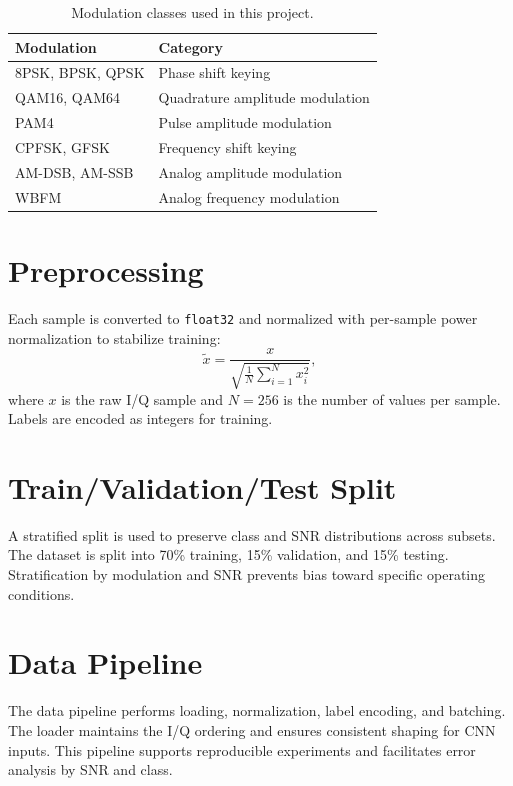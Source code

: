 \documentclass[12pt,a4paper]{report}
\begin{document}
\begin{table}[H]
    \centering
    \caption{Modulation classes used in this project.}
    \label{tab:classes}
    \begin{tabular}{p{} p{}}
        \toprule
        \textbf{Modulation} & \textbf{Category} \\
        \midrule
        8PSK, BPSK, QPSK & Phase shift keying \\
        QAM16, QAM64 & Quadrature amplitude modulation \\
        PAM4 & Pulse amplitude modulation \\
        CPFSK, GFSK & Frequency shift keying \\
        AM-DSB, AM-SSB & Analog amplitude modulation \\
        WBFM & Analog frequency modulation \\
        \bottomrule
    \end{tabular}
\end{table}

\section{Preprocessing}
Each sample is converted to \texttt{float32} and normalized with per-sample power normalization to stabilize training:
\begin{equation}
    \tilde{x} = \frac{x}{\sqrt{\frac{1}{N}\sum_{i=1}^{N} x_i^2}},
\end{equation}
where $x$ is the raw I/Q sample and $N=256$ is the number of values per sample. Labels are encoded as integers for training.

\section{Train/Validation/Test Split}
A stratified split is used to preserve class and SNR distributions across subsets. The dataset is split into 70\% training, 15\% validation, and 15\% testing. Stratification by modulation and SNR prevents bias toward specific operating conditions.

\section{Data Pipeline}
The data pipeline performs loading, normalization, label encoding, and batching. The loader maintains the I/Q ordering and ensures consistent shaping for CNN inputs. This pipeline supports reproducible experiments and facilitates error analysis by SNR and class.
\end{document}
